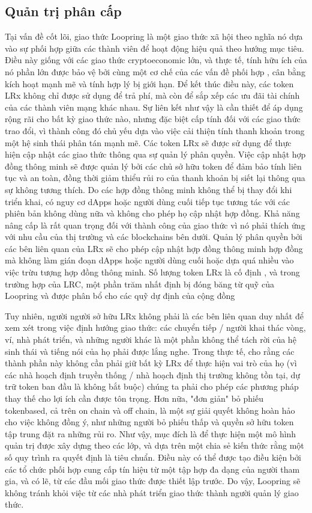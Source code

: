 \documentclass[12pt,a4paper]{article}
\begin{document}
\begin{multicols}{2}
\subsection{Quản trị phân cấp}
Tại vấn đề cốt lõi, giao thức Loopring là một giao thức xã hội theo nghĩa nó dựa vào sự phối hợp giữa các thành viên để hoạt động hiệu quả theo hướng mục tiêu. Điều này giống với các giao thức cryptoeconomic lớn, và thực tế, tính hữu ích của nó phần lớn được bảo vệ bởi cùng một cơ chế của các vấn đề phối hợp \cite{ERC20}, cân bằng kích hoạt mạnh mẽ  và tính hợp lý bị giới hạn. Để kết thúc điều này, các token LRx không chỉ được sử dụng để trả phí, mà còn để sắp xếp các ưu đãi tài chính của các thành viên mạng khác nhau. Sự liên kết như vậy là cần thiết để áp dụng rộng rãi cho bất kỳ giao thức nào, nhưng đặc biệt cấp tính đối với các giao thức trao đổi, vì thành công đó chủ yếu dựa vào việc cải thiện tính thanh khoản trong một hệ sinh thái phân tán mạnh mẽ.
Các token LRx sẽ được sử dụng để thực hiện cập nhật các giao thức thông qua sự quản lý phân quyền. Việc cập nhật hợp đồng thông minh sẽ được quản lý bởi các chủ sở hữu token để đảm bảo tính liên tục và an toàn, đồng thời giảm thiểu rủi ro của thanh khoản bị siết lại thông qua sự không tương thích. Do các hợp đồng thông minh không thể bị thay đổi khi triển khai, có nguy cơ dApps hoặc người dùng cuối tiếp tục tương tác với các phiên bản không dùng nữa và không cho phép họ cập nhật hợp đồng. Khả năng nâng cấp là rất quan trọng đối với thành công của giao thức vì nó phải thích ứng với nhu cầu của thị trường và các blockchains bên dưới. Quản lý phân quyền bởi các bên liên quan của LRx sẽ cho phép cập nhật hợp đồng thông minh hợp đồng mà không làm gián đoạn dApps hoặc người dùng cuối hoặc dựa quá nhiều vào việc trừu tượng hợp đồng thông minh. Số lượng token LRx là cố định , và trong trường hợp của LRC, một phần trăm nhất định bị đóng băng từ quỹ của Loopring và được phân bổ cho các quỹ dự định của cộng đồng

Tuy nhiên, người người sở hữu LRx không phải là các bên liên quan duy nhất để xem xét trong việc định hướng giao thức: các chuyển tiếp / người khai thác vòng, ví, nhà phát triển, và những người khác là một phần không thể tách rời của hệ sinh thái và tiếng nói của họ phải được lắng nghe. Trong thực tế, cho rằng các thành phần này không cần phải giữ bất kỳ LRx để thực hiện vai trò của họ (vì các nhà hoạch định truyền thống / nhà hoạch định thị trường không tồn tại, dự trữ token ban đầu là không bắt buộc) chúng ta phải cho phép các phương pháp thay thế cho lợi ích cần được tôn trọng. Hơn nữa, "đơn giản" bỏ phiếu tokenbased, cả trên on chain và off chain, là một sự giải quyết không hoàn hảo cho việc không đồng ý, như những người bỏ phiếu thấp và quyền sở hữu token tập trung đặt ra những rủi ro. Như vậy, mục đích là để thực hiện một mô hình quản trị được xây dựng theo các lớp, và dựa trên một chia sẻ kiến thức rằng một số quy trình ra quyết định là tiêu chuẩn. Điều này có thể được tạo điều kiện bởi các tổ chức phối hợp cung cấp tín hiệu từ một tập hợp đa dạng của người tham gia, và có lẽ, từ các đầu mối giao thức được thiết lập trước. Do vậy, Loopring sẽ không tránh khỏi việc từ các nhà phát triển giao thức thành người quản lý giao thức.

\end{multicols}
\end{document}

